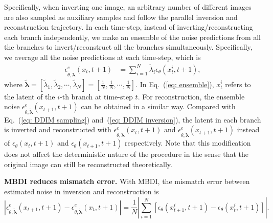 \documentclass{article}
\newcommand\norm[1]{|#1|}
\begin{document}
Specifically, when inverting one image, an arbitrary number of different images are also sampled as auxiliary samples and follow the parallel inversion and reconstruction trajectory. %
In each time-step, instead of inverting/reconstructing each branch independently, we make an ensemble of the noise predictions from all the branches to invert/reconstruct all the branches simultaneously.
Specifically, we average all the noise predictions at each time-step, which is 
\begin{align}
     \epsilon_{\theta, \tilde{\boldsymbol{\lambda}}}^{e}\left(x_t, t+1\right)&=\sum_{i=1}^{N}\tilde{\lambda}_{i}\epsilon_{\theta}\left(x_{t}^{i}, t+1\right),
\label{eq: ensemble}
\end{align}
where $\tilde{\boldsymbol{\lambda}}=[\tilde{\lambda}_1, \tilde{\lambda}_2, \cdots, \tilde{\lambda}_N] =\left[\frac{1}{N},\frac{1}{N},\cdots,\frac{1}{N}\right]$.
In Eq.~(\ref{eq: ensemble}), $x_{t}^{i}$ refers to the latent of the $i$-th branch at time-step $t$.
For reconstruction, the ensemble noise $\epsilon_{\theta, \tilde{\boldsymbol{\lambda}}}^{e}\left(x_{t+1}, t+1\right)$ 
 can be obtained in a similar way.
Compared with Eq.~(\ref{eq: DDIM sampling}) and~(\ref{eq: DDIM inversion}), the latent in each branch is inverted and reconstructed with $\epsilon_{\theta, \tilde{\boldsymbol{\lambda}}}^{e}\left(x_t, t+1\right)$ and $\epsilon_{\theta, \tilde{\boldsymbol{\lambda}}}^{e}\left(x_{t+1}, t+1\right)$ instead of $\epsilon_{\theta}\left(x_t, t+1\right)$ and $\epsilon_{\theta}\left(x_{t+1}, t+1\right)$ respectively.
Note that this modification does not affect the deterministic nature of the procedure in the sense that the original image can still be reconstructed theoretically.


\textbf{MBDI reduces mismatch error.}
With MBDI, the mismatch error between estimated noise in inversion and reconstruction is
\begin{equation}
    \norm{\epsilon_{\theta, \tilde{\boldsymbol{\lambda}}}^{e}\left(x_{t+1}, t+1\right)-\epsilon_{\theta, \tilde{\boldsymbol{\lambda}}}^{e}\left(x_t, t+1\right)} =\frac{1}{N}\norm{\sum_{i=1}^{N}\left[\epsilon_{\theta}\left(x_{t+1}^{i}, t+1\right)-\epsilon_{\theta}\left(x_{t}^{i}, t+1\right)\right]}.
\label{eq: ensemble error}
\end{equation}
\end{document}
